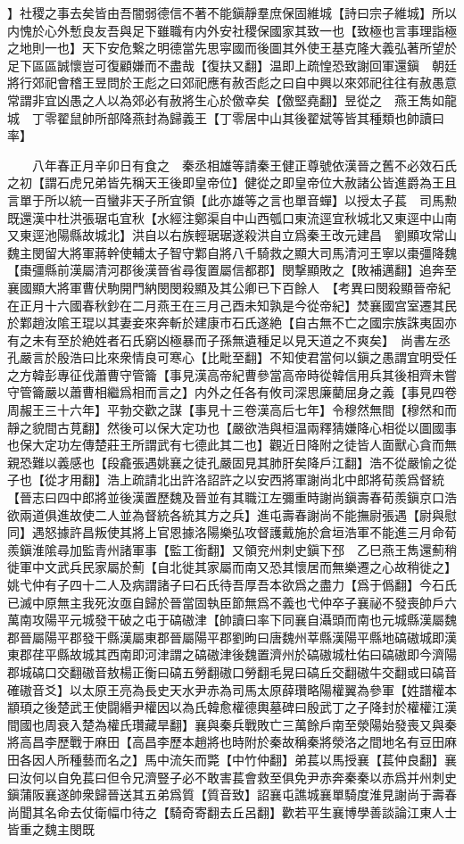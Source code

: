 】社稷之事去矣皆由吾闇弱德信不著不能鎭靜羣庶保固維城【詩曰宗子維城】所以内愧於心外慙良友吾與足下雖職有内外安社稷保國家其致一也【致極也言事理詣極之地則一也】天下安危繋之明德當先思寜國而後圖其外使王基克隆大義弘著所望於足下區區誠懷豈可復顧嫌而不盡哉【復扶又翻】温即上疏惶恐致謝回軍還鎭　朝廷將行郊祀會稽王昱問於王彪之曰郊祀應有赦否彪之曰自中興以來郊祀往往有赦愚意常謂非宜凶愚之人以為郊必有赦將生心於儌幸矣【儌堅堯翻】昱從之　燕王雋如龍城　丁零翟鼠帥所部降燕封為歸義王【丁零居中山其後翟斌等皆其種類也帥讀曰率】

　　八年春正月辛卯日有食之　秦丞相雄等請秦王健正尊號依漢晉之舊不必效石氏之初【謂石虎兄弟皆先稱天王後即皇帝位】健從之即皇帝位大赦諸公皆進爵為王且言單于所以統一百蠻非天子所宜領【此亦雄等之言也單音蟬】以授太子萇　司馬勲既還漢中杜洪張琚屯宜秋【水經注鄭渠自中山西瓠口東流逕宜秋城北又東逕中山南又東逕池陽縣故城北】洪自以右族輕琚琚遂殺洪自立爲秦王改元建昌　劉顯攻常山魏主閔留大將軍蔣幹使輔太子智守鄴自將八千騎救之顯大司馬清河王寧以棗彊降魏【棗彊縣前漢屬清河郡後漢晉省尋復置屬信都郡】閔撃顯敗之【敗補邁翻】追奔至襄國顯大將軍曹伏駒開門納閔閔殺顯及其公卿已下百餘人　【考異曰閔殺顯晉帝紀在正月十六國春秋鈔在二月燕王在三月己酉未知孰是今從帝紀】焚襄國宫室遷其民於鄴趙汝隂王琨以其妻妾來奔斬於建康市石氏遂絶【自古無不亡之國宗族誅夷固亦有之未有至於絶姓者石氏窮凶極暴而子孫無遺種足以見天道之不爽矣】　尚書左丞孔嚴言於殷浩曰比來衆情良可寒心【比毗至翻】不知使君當何以鎭之愚謂宜明受任之方韓彭專征伐蕭曹守管籥【事見漢高帝紀曹參當高帝時從韓信用兵其後相齊未嘗守管籥嚴以蕭曹相繼爲相而言之】内外之任各有攸司深思廉藺屈身之義【事見四卷周赧王三十六年】平勃交歡之謀【事見十三卷漢高后七年】令穆然無間【穆然和而靜之貌間古莧翻】然後可以保大定功也【嚴欲浩與桓温兩釋猜嫌降心相從以圖國事也保大定功左傳楚莊王所謂武有七德此其二也】觀近日降附之徒皆人面獸心貪而無親恐難以義感也【段龕張遇姚襄之徒孔嚴固見其肺肝矣降戶江翻】浩不從嚴愉之從子也【從才用翻】浩上疏請北出許洛詔許之以安西將軍謝尚北中郎將荀羨爲督統【晉志曰四中郎將並後漢置歷魏及晉並有其職江左彌重時謝尚鎭壽春荀羨鎭京口浩欲兩道俱進故使二人並為督統各統其方之兵】進屯壽春謝尚不能撫尉張遇【尉與慰同】遇怒據許昌叛使其將上官恩據洛陽樂弘攻督護戴施於倉垣浩軍不能進三月命荀羨鎭淮隂尋加監青州諸軍事【監工銜翻】又領兖州刺史鎭下邳　乙巳燕王雋還薊稍徙軍中文武兵民家屬於薊【自北徙其家屬而南又恐其懷居而無樂遷之心故稍徙之】　姚弋仲有子四十二人及病謂諸子曰石氏待吾厚吾本欲爲之盡力【爲于僞翻】今石氏已滅中原無主我死汝亟自歸於晉當固執臣節無爲不義也弋仲卒子襄祕不發喪帥戶六萬南攻陽平元城發干破之屯于碻磝津【帥讀曰率下同襄自灄頭而南也元城縣漢屬魏郡晉屬陽平郡發干縣漢屬東郡晉屬陽平郡劉昫曰唐魏州莘縣漢陽平縣地碻磝城即漢東郡荏平縣故城其西南即河津謂之碻磝津後魏置濟州於碻磝城杜佑曰碻磝即今濟陽郡城碻口交翻磝音敖楊正衡曰碻五勞翻磝口勞翻毛晃曰碻丘交翻磝牛交翻或曰碻音確磝音爻】以太原王亮為長史天水尹赤為司馬太原薛瓚略陽權翼為參軍【姓譜權本顓頊之後楚武王使闘緡尹權因以為氏韓愈權德輿墓碑曰殷武丁之子降封於權權江漢間國也周衰入楚為權氏瓚藏旱翻】襄與秦兵戰敗亡三萬餘戶南至滎陽始發喪又與秦將高昌李歷戰于麻田【高昌李歷本趙將也時附於秦故稱秦將滎洛之間地名有豆田麻田各因人所種藝而名之】馬中流矢而斃【中竹仲翻】弟萇以馬授襄【萇仲良翻】襄曰汝何以自免萇曰但令兄濟豎子必不敢害萇會救至俱免尹赤奔秦秦以赤爲并州刺史鎭蒲阪襄遂帥衆歸晉送其五弟爲質【質音致】詔襄屯譙城襄單騎度淮見謝尚于壽春尚聞其名命去仗衛幅巾待之【騎奇寄翻去丘呂翻】歡若平生襄博學善談論江東人士皆重之魏主閔既
